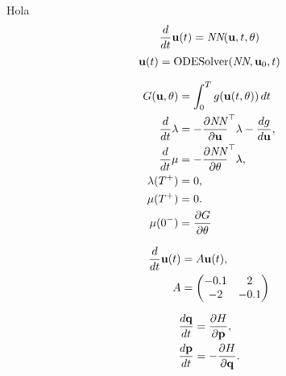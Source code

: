 \documentclass{article}
\author{}
\title{}
\date{}
\renewcommand{\vec}{\bold}
\begin{document}
Hola
\begin{align}
	\frac{d}{dt}\vec{u}(t) = \textit{NN}(\vec{u},t,\theta)
\end{align}
\begin{align}
	\vec{u}(t) = \text{ODESolver}(\textit{NN},\vec{u}_0,t)
\end{align}

\begin{align}
G(\vec{u},\theta) &= \int_0^T g(\vec{u}(t,\theta))\, dt\\
\frac{d}{dt} \vec{\lambda} &= -\frac{\partial \textit{NN}}{\partial\vec{u}}^\top \vec{\lambda}- \frac{dg}{d\vec{u}},\\
\frac{d}{dt} \vec{\mu} &= -\frac{\partial \textit{NN}}{\partial\theta}^\top  \vec{\lambda},\\
\lambda(T^+) &= 0,\\
\mu(T^+) &= 0.\\
\mu(0^-) &= \frac{\partial G}{\partial \theta}
\end{align}

\begin{align}
	\frac{d}{dt}\vec{u}(t) &= A\vec{u}(t),\\
	A &= \begin{pmatrix}
		-0.1 & 2 \\
		-2 & -0.1
	\end{pmatrix}
\end{align}

\begin{align}
	\frac{d\vec{q}}{dt} &= \frac{\partial H}{\partial \vec{p}},\\
	\frac{d\vec{p}}{dt} &= -\frac{\partial H}{\partial \vec{q}}.
\end{align}
\end{document}
